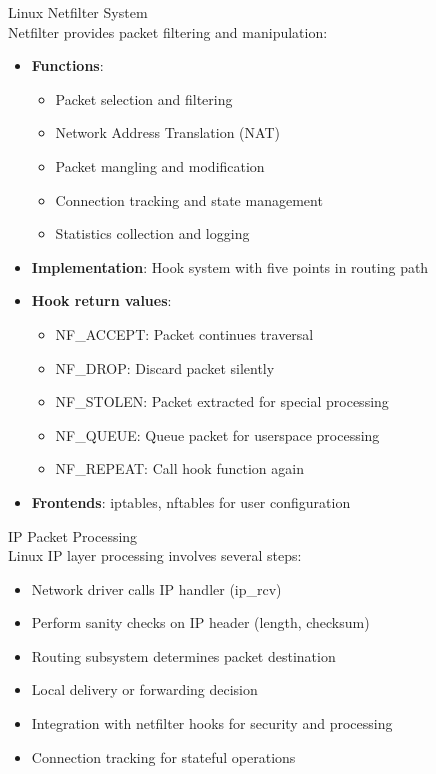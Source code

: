 \begin{definition}{Linux Netfilter System}\\
    Netfilter provides packet filtering and manipulation:
    \begin{itemize}
        \item \textbf{Functions}:
            \begin{itemize}
                \item Packet selection and filtering
                \item Network Address Translation (NAT)
                \item Packet mangling and modification
                \item Connection tracking and state management
                \item Statistics collection and logging
            \end{itemize}
        \item \textbf{Implementation}: Hook system with five points in routing path
        \item \textbf{Hook return values}:
            \begin{itemize}
                \item NF\_ACCEPT: Packet continues traversal
                \item NF\_DROP: Discard packet silently
                \item NF\_STOLEN: Packet extracted for special processing
                \item NF\_QUEUE: Queue packet for userspace processing
                \item NF\_REPEAT: Call hook function again
            \end{itemize}
        \item \textbf{Frontends}: iptables, nftables for user configuration
    \end{itemize}
\end{definition}

\begin{definition}{IP Packet Processing}\\
    Linux IP layer processing involves several steps:
    \begin{itemize}
        \item Network driver calls IP handler (ip\_rcv)
        \item Perform sanity checks on IP header (length, checksum)
        \item Routing subsystem determines packet destination
        \item Local delivery or forwarding decision
        \item Integration with netfilter hooks for security and processing
        \item Connection tracking for stateful operations
    \end{itemize}
\end{definition}

